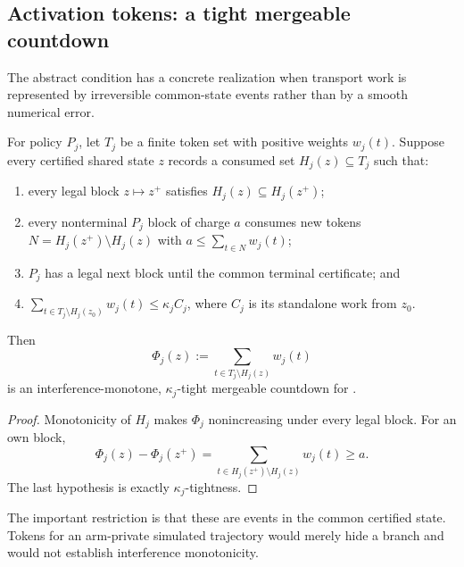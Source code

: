 \subsection{Activation tokens: a tight mergeable countdown}

The abstract condition has a concrete realization when transport work is
represented by irreversible common-state events rather than by a smooth
numerical error.

\begin{lemma}
\label{lem:activation-token-countdown}
For policy $P_j$, let $T_j$ be a finite token set with positive weights
$w_j(t)$.  Suppose every certified shared state $z$ records a consumed set
$H_j(z)\subseteq T_j$ such that:
\begin{enumerate}[label=(\roman*),leftmargin=*]
 \item every legal block $z\mapsto z^+$ satisfies
 $H_j(z)\subseteq H_j(z^+)$;
 \item every nonterminal $P_j$ block of charge $a$ consumes new tokens
 $N=H_j(z^+)\setminus H_j(z)$ with
 $a\leq\sum_{t\in N}w_j(t)$;
 \item $P_j$ has a legal next block until the common terminal certificate;
 and
 \item
 $\sum_{t\in T_j\setminus H_j(z_0)}w_j(t)\leq\kappa_j C_j$,
 where $C_j$ is its standalone work from $z_0$.
\end{enumerate}
Then
\begin{equation}
 \Phi_j(z):=\sum_{t\in T_j\setminus H_j(z)}w_j(t)
 \label{eq:activation-token-potential}
\end{equation}
is an interference-monotone, $\kappa_j$-tight mergeable countdown for
.
\end{lemma}

\begin{proof}
Monotonicity of $H_j$ makes $\Phi_j$ nonincreasing under every legal block.
For an own block,
\[
 \Phi_j(z)-\Phi_j(z^+)
 =\sum_{t\in H_j(z^+)\setminus H_j(z)}w_j(t)\geq a.
\]
The last hypothesis is exactly $\kappa_j$-tightness.
\end{proof}

The important restriction is that these are events in the common certified
state.  Tokens for an arm-private simulated trajectory would merely hide a
branch and would not establish interference monotonicity.

